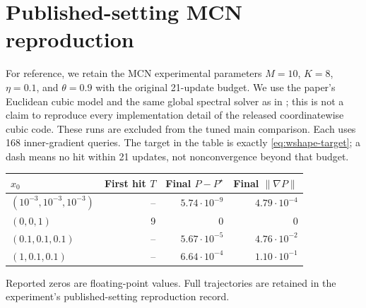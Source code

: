 \documentclass{article}
\begin{document}
\clearpage
\section{Published-setting MCN reproduction}
\label{app:wshape-published}

For reference, we retain the MCN experimental parameters
$M=10$, $K=8$, $\eta=0.1$, and $\theta=0.9$ with the original
21-update budget. We use the paper's Euclidean cubic model and the
same global spectral solver as in ; this is not
a claim to reproduce every implementation detail of the released
coordinatewise cubic code. These runs are excluded from the tuned
main comparison. Each uses 168 inner-gradient queries. The target
in the table is exactly \eqref{eq:wshape-target}; a dash means no
hit within 21 updates, not nonconvergence beyond that budget.

\begin{center}
\begin{tabular}{lrrr}
\toprule
$x_0$ & First hit $T$ & Final $P-P^\star$ & Final $\|\nabla P\|$\\
\midrule
$(10^{-3},10^{-3},10^{-3})$ & -- & $5.74\cdot10^{-9}$ & $4.79\cdot10^{-4}$\\
$(0,0,1)$ & 9 & $0$ & $0$\\
$(0.1,0.1,0.1)$ & -- & $5.67\cdot10^{-5}$ & $4.76\cdot10^{-2}$\\
$(1,0.1,0.1)$ & -- & $6.64\cdot10^{-4}$ & $1.10\cdot10^{-1}$\\
\bottomrule
\end{tabular}
\end{center}
Reported zeros are floating-point values. Full trajectories are
retained in the experiment's published-setting reproduction record.

\clearpage




\end{document}
